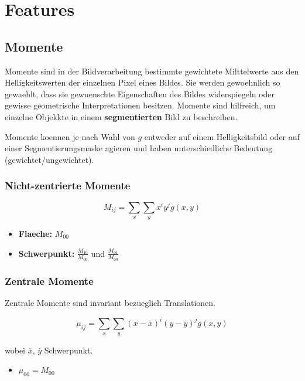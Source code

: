 \newpage

\section{Features}

\subsection{Momente}

Momente sind in der Bildverarbeitung bestimmte gewichtete Milttelwerte aus den Helligkeitswerten der einzelnen Pixel eines Bildes.
Sie werden gewoehnlich so gewaehlt, dass sie gewuenschte Eigenschaften des Bildes widerspiegeln oder gewisse geometrische Interpretationen besitzen.
Momente sind hilfreich, um einzelne Objekkte in einem \textbf{segmentierten} Bild zu beschreiben.

Momente koennen je nach Wahl von $g$ entweder auf einem Helligkeitsbild oder auf einer Segmentierungsmaske agieren und haben unterschiedliche Bedeutung (gewichtet/ungewichtet).

\subsubsection{Nicht-zentrierte Momente}

\begin{equation}
  M_{ij} = \sum_x \sum_y x^i y^j g(x, y)
\end{equation}

\begin{itemize}
  \item \textbf{Flaeche:} $M_{00}$
  \item \textbf{Schwerpunkt:} $\frac{M_{10}}{M_{00}}$ und $\frac{M_{01}}{M_{00}}$
\end{itemize}

\subsubsection{Zentrale Momente}

Zentrale Momente sind invariant bezueglich Translationen.

\begin{equation}
  \mu_{ij} = \sum_x \sum_y (x - \overline{x})^i (y - \overline{y})^j g(x, y)
\end{equation}

wobei $\overline{x}$, $\overline{y}$ Schwerpunkt.

\begin{itemize}
  \item $\mu_{00} = M_{00}$
\end{itemize}

